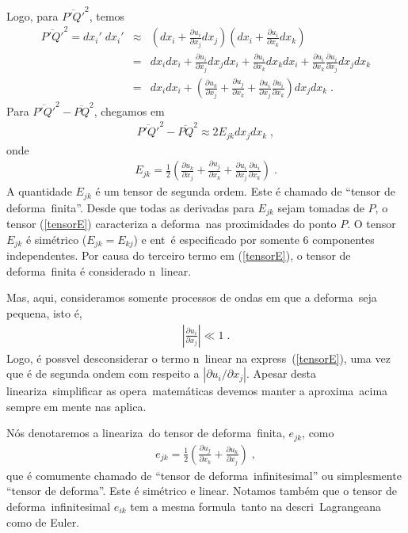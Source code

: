 Logo, para $\overline{P'Q'}^2$, temos
\begin{eqnarray}
\overline{P'Q'}^2 = dx_i' \; dx_i' &\approx& \left(dx_i +
\frac{\partial u_i}{\partial x_j} dx_j\right) \left(dx_i +
\frac{\partial u_i}{\partial x_k} dx_k\right) \\
&=& dx_i dx_i +  \frac{\partial u_i}{\partial x_j} dx_j
dx_i + \frac{\partial u_i}{\partial x_k} dx_k  dx_i
+ \frac{\partial u_i}{\partial x_k} \frac{\partial u_i}
{\partial x_j} dx_j dx_k \\
&=& dx_i dx_i + \left( \frac{\partial u_k}{\partial x_j} +
\frac{\partial u_j}{\partial x_k} + \frac{\partial u_i}
{\partial x_j} \frac{\partial u_i}{\partial x_k}\right)
dx_j dx_k \; .
\end{eqnarray}
Para $\overline{P'Q'}^2 - \overline{PQ}^2$, chegamos em
\begin{eqnarray}
\overline{P'Q'}^2 - \overline{PQ}^2 \approx 2 E_{jk}
dx_j dx_k \; ,
\label{eq:def}
\end{eqnarray}
onde
\begin{eqnarray} \label{tensorE}
E_{jk} = \frac{1}{2} \left( \frac{\partial u_k}
{\partial x_j} + \frac{\partial u_j}{\partial x_k} +
\frac{\partial u_i}{\partial x_j} \frac{\partial u_i}
{\partial x_k}\right) \; .
\end{eqnarray}
A quantidade $E_{jk}$ \'e um tensor de segunda ordem.
Este \'e chamado de ``tensor de deforma\cao\ finita''.
Desde que todas as derivadas para $E_{jk}$ sejam tomadas
de $P$, o tensor (\ref{tensorE}) caracteriza a
deforma\cao\ nas proximidades do ponto $P$. O tensor
$E_{jk}$ \'e sim\'etrico ($E_{jk} = E_{kj}$) e ent\ao\ \'e
especificado por somente 6 componentes independentes. Por
causa do terceiro termo em (\ref{tensorE}), o tensor de
deforma\cao\ finita \'e considerado n\ao\ linear.

Mas, aqui, consideramos somente processos de ondas
em que a deforma\cao\ seja pequena, isto \'e,
\begin{eqnarray}
\left|\frac{\partial u_i}{\partial x_j}\right| \ll 1 \; .
\label{def_peq}
\end{eqnarray}
Logo, \'e poss\ih vel desconsiderar o termo n\ao\ linear
na express\ao\ (\ref{tensorE}), uma vez que \'e de segunda
ondem com respeito a  $|\partial u_i / \partial x_j|$.
Apesar desta lineariza\cao\ simplificar as opera\coes\
matem\'aticas devemos manter a aproxima\cao\ acima sempre
em mente nas aplica\coes.

N\'os denotaremos a lineariza\cao\ do tensor de
deforma\cao\ finita, $e_{jk}$, como
\begin{eqnarray} \label{td}
e_{jk} = \frac{1}{2} \left( \frac{\partial u_j}
{\partial x_k} +\frac{\partial u_k}{\partial x_j}\right)
\; ,
\end{eqnarray}
que \'e comumente chamado de ``tensor de deforma\cao\
infinitesimal'' ou simplesmente ``tensor de deforma\cao''.
Este \'e sim\'etrico e linear. Notamos tamb\'em que o
tensor de deforma\cao\ infinitesimal $e_{ik}$ tem a mesma formula\cao\
tanto na descri\cao\ Lagrangeana como de Euler.

